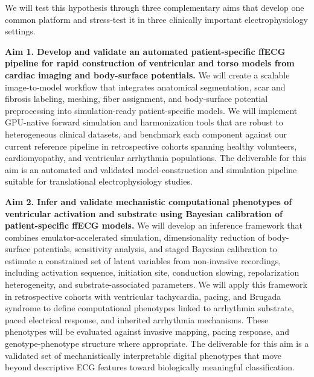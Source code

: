 \documentclass[letterpaper]{article}
\begin{document}
We will test this hypothesis through three complementary aims that develop one common platform and stress-test it in three clinically important electrophysiology settings.

\textbf{Aim 1. Develop and validate an automated patient-specific ffECG pipeline for rapid construction of ventricular and torso models from cardiac imaging and body-surface potentials.} We will create a scalable image-to-model workflow that integrates anatomical segmentation, scar and fibrosis labeling, meshing, fiber assignment, and body-surface potential preprocessing into simulation-ready patient-specific models. We will implement GPU-native forward simulation and harmonization tools that are robust to heterogeneous clinical datasets, and benchmark each component against our current reference pipeline in retrospective cohorts spanning healthy volunteers, cardiomyopathy, and ventricular arrhythmia populations. The deliverable for this aim is an automated and validated model-construction and simulation pipeline suitable for translational electrophysiology studies.

\textbf{Aim 2. Infer and validate mechanistic computational phenotypes of ventricular activation and substrate using Bayesian calibration of patient-specific ffECG models.} We will develop an inference framework that combines emulator-accelerated simulation, dimensionality reduction of body-surface potentials, sensitivity analysis, and staged Bayesian calibration to estimate a constrained set of latent variables from non-invasive recordings, including activation sequence, initiation site, conduction slowing, repolarization heterogeneity, and substrate-associated parameters. We will apply this framework in retrospective cohorts with ventricular tachycardia, pacing, and Brugada syndrome to define computational phenotypes linked to arrhythmia substrate, paced electrical response, and inherited arrhythmia mechanisms. These phenotypes will be evaluated against invasive mapping, pacing response, and genotype-phenotype structure where appropriate. The deliverable for this aim is a validated set of mechanistically interpretable digital phenotypes that move beyond descriptive ECG features toward biologically meaningful classification.
\end{document}
